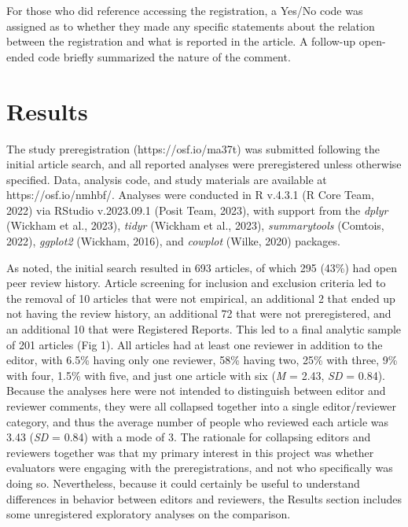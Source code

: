 \documentclass[authordate, empirical]{jote-new-article}
\begin{document}
	For those who did reference accessing the registration, a Yes/No code was assigned as to whether they made any specific statements about the relation between the registration and what is reported in the article. A follow-up open-ended code briefly summarized the nature of the comment.



	\section{\textbf{Results}}



	The study preregistration (https://osf.io/ma37t) was submitted following the initial article search, and all reported analyses were preregistered unless otherwise specified. Data, analysis code, and study materials are available at https://osf.io/nmhbf/. Analyses were conducted in R v.4.3.1 (R Core Team, 2022) via RStudio v.2023.09.1 (Posit Team, 2023), with support from the \emph{dplyr} (Wickham et al., 2023), \emph{tidyr }(Wickham et al., 2023), \emph{summarytools }(Comtois, 2022), \emph{ggplot2 }(Wickham, 2016), and \emph{cowplot }(Wilke, 2020) packages.



	As noted, the initial search resulted in 693 articles, of which 295 (43\%) had open peer review history. Article screening for inclusion and exclusion criteria led to the removal of 10 articles that were not empirical, an additional 2 that ended up not having the review history, an additional 72 that were not preregistered, and an additional 10 that were Registered Reports. This led to a final analytic sample of 201 articles (Fig 1). All articles had at least one reviewer in addition to the editor, with 6.5\% having only one reviewer, 58\% having two, 25\% with three, 9\% with four, 1.5\% with five, and just one article with six (\emph{M} = 2.43, \emph{SD} = 0.84). Because the analyses here were not intended to distinguish between editor and reviewer comments, they were all collapsed together into a single editor/reviewer category, and thus the average number of people who reviewed each article was 3.43 (\emph{SD} = 0.84) with a mode of 3. The rationale for collapsing editors and reviewers together was that my primary interest in this project was whether evaluators were engaging with the preregistrations, and not who specifically was doing so. Nevertheless, because it could certainly be useful to understand differences in behavior between editors and reviewers, the Results section includes some unregistered exploratory analyses on the comparison.
\end{document}
